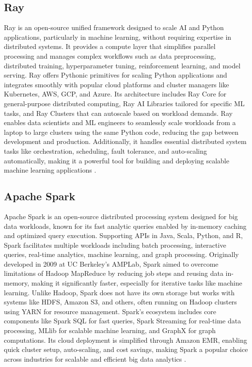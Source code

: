 \documentclass[conference]{IEEEtran}
\begin{document}
\subsection{Ray}
Ray is an open-source unified framework designed to scale AI and Python applications,
particularly in machine learning, without requiring expertise in distributed systems.
It provides a compute layer that simplifies parallel processing and manages complex workflows
such as data preprocessing, distributed training, hyperparameter tuning, reinforcement learning,
and model serving. Ray offers Pythonic primitives for scaling Python applications and integrates
smoothly with popular cloud platforms and cluster managers like Kubernetes, AWS, GCP, and
Azure. Its architecture includes Ray Core for general-purpose distributed computing, Ray AI
Libraries tailored for specific ML tasks, and Ray Clusters that can autoscale based on
workload demands. Ray enables data scientists and ML engineers to seamlessly scale workloads
from a laptop to large clusters using the same Python code, reducing the gap between development
and production. Additionally, it handles essential distributed system tasks like orchestration,
scheduling, fault tolerance, and auto-scaling automatically, making it a powerful tool for
building and deploying scalable machine learning applications \cite{ray}.

\subsection{Apache Spark}
Apache Spark is an open-source distributed processing system designed for big data workloads,
known for its fast analytic queries enabled by in-memory caching and optimized query execution.
Supporting APIs in Java, Scala, Python, and R, Spark facilitates multiple workloads including
batch processing, interactive queries, real-time analytics, machine learning, and graph
processing. Originally developed in 2009 at UC Berkeley’s AMPLab, Spark aimed to overcome
limitations of Hadoop MapReduce by reducing job steps and reusing data in-memory, making it
significantly faster, especially for iterative tasks like machine learning. Unlike Hadoop,
Spark does not have its own storage but works with systems like HDFS, Amazon S3, and others,
often running on Hadoop clusters using YARN for resource management. Spark’s ecosystem
includes core components like Spark SQL for fast queries, Spark Streaming for real-time
data processing, MLlib for scalable machine learning, and GraphX for graph computations.
Its cloud deployment is simplified through Amazon EMR, enabling quick cluster setup, auto-scaling,
and cost savings, making Spark a popular choice across industries for scalable and efficient
big data analytics \cite{spark}.
\end{document}
